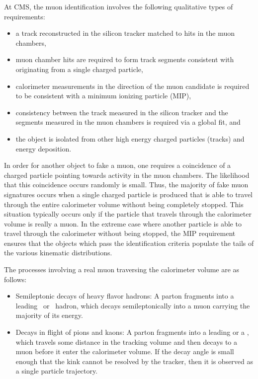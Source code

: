 \documentclass{cmspaper}
\begin{document}

At CMS, the muon identification involves the following qualitative types of requirements:
\begin{itemize}
\item a track reconstructed in the silicon tracker matched to hits in the muon chambers,
\item muon chamber hits are required to form track segments consistent with originating from a single charged particle,
\item calorimeter measurements in the direction of the muon candidate is required to be consistent with a minimum ionizing particle (MIP), 
\item consistency between the track measured in the silicon tracker and the segments measured in the muon chambers is required via a global fit, and
\item the object is isolated from other high energy charged particles (tracks) and energy deposition.
\end{itemize}

In order for another object to fake a muon, one requires a coincidence of a charged particle pointing towards activity in the muon chambers. The likelihood that this coincidence occurs randomly is small. Thus, the majority of fake muon signatures occurs when a single charged particle is produced that is able to travel through the entire calorimeter volume without being completely stopped. This situation typically occurs only if the particle that travels through the calorimeter volume is really a muon. In the extreme case where another particle is able to travel through the calorimeter without being stopped, the MIP requirement ensures that the objects which pass the identification criteria populate the tails of the various kinematic distributions.

The processes involving a real muon traversing the calorimeter volume are as follows: 
\begin{itemize}
\item Semileptonic decays of heavy flavor hadrons: A parton fragments into a leading \B\ or \D\ hadron, which decays semileptonically into a muon carrying the majority of its energy. 
\item Decays in flight of pions and kaons: A parton fragments into a leading \pipm or a \Kpm, which travels some distance in the tracking volume and then decays to a muon before it enter the calorimeter volume. If the decay angle is small enough that the kink cannot be resolved by the tracker, then it is observed as a single particle trajectory.
\end{itemize}
\end{document}
